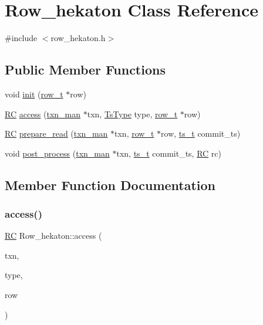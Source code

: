 \hypertarget{classRow__hekaton}{}\section{Row\+\_\+hekaton Class Reference}
\label{classRow__hekaton}


{\ttfamily \#include $<$row\+\_\+hekaton.\+h$>$}

\subsection*{Public Member Functions}
\begin{DoxyCompactItemize}
\item 
void \hyperlink{classRow__hekaton_a2d8710389607a31f79cfa616ee88eea8}{init} (\hyperlink{classrow__t}{row\+\_\+t} $\ast$row)
\item 
\hyperlink{global_8h_a78c49a674c810fdd03d20432f7be864a}{RC} \hyperlink{classRow__hekaton_a4888b6b2cc7dbb74872c528ff8bd8531}{access} (\hyperlink{classtxn__man}{txn\+\_\+man} $\ast$txn, \hyperlink{global_8h_a1a7f6ca1462293fe053b5ae74a6c4eda}{Ts\+Type} type, \hyperlink{classrow__t}{row\+\_\+t} $\ast$row)
\item 
\hyperlink{global_8h_a78c49a674c810fdd03d20432f7be864a}{RC} \hyperlink{classRow__hekaton_a891063b67355e2677fa38bdac4a0f52d}{prepare\+\_\+read} (\hyperlink{classtxn__man}{txn\+\_\+man} $\ast$txn, \hyperlink{classrow__t}{row\+\_\+t} $\ast$row, \hyperlink{global_8h_aaf095dfc9b10f757c968fe146ad7e724}{ts\+\_\+t} commit\+\_\+ts)
\item 
void \hyperlink{classRow__hekaton_a16995f9c439700a4c777c78ea8531536}{post\+\_\+process} (\hyperlink{classtxn__man}{txn\+\_\+man} $\ast$txn, \hyperlink{global_8h_aaf095dfc9b10f757c968fe146ad7e724}{ts\+\_\+t} commit\+\_\+ts, \hyperlink{global_8h_a78c49a674c810fdd03d20432f7be864a}{RC} rc)
\end{DoxyCompactItemize}


\subsection{Member Function Documentation}
\mbox{\label{classRow__hekaton_a4888b6b2cc7dbb74872c528ff8bd8531}} 
\subsubsection{\texorpdfstring{access()}{access()}}
{\footnotesize\ttfamily \hyperlink{global_8h_a78c49a674c810fdd03d20432f7be864a}{RC} Row\+\_\+hekaton\+::access (\begin{DoxyParamCaption}\item[{\hyperlink{classtxn__man}{txn\+\_\+man} $\ast$}]{txn,  }\item[{\hyperlink{global_8h_a1a7f6ca1462293fe053b5ae74a6c4eda}{Ts\+Type}}]{type,  }\item[{\hyperlink{classrow__t}{row\+\_\+t} $\ast$}]{row }\end{DoxyParamCaption})}


